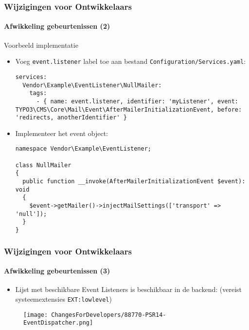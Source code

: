 \begin{frame}[fragile]
	\frametitle{Wijzigingen voor Ontwikkelaars}
	\framesubtitle{Afwikkeling gebeurtenissen (2)}

	\lstset{basicstyle=\tiny\ttfamily}

	Voorbeeld implementatie

	\begin{itemize}\smaller
		\item[\ding{202}] Voeg \texttt{event.listener} label toe aan bestand \texttt{Configuration/Services.yaml}:

\begin{lstlisting}
services:
  Vendor\Example\EventListener\NullMailer:
    tags:
      - { name: event.listener, identifier: 'myListener', event: TYPO3\CMS\Core\Mail\Event\AfterMailerInitializationEvent, before: 'redirects, anotherIdentifier' }
\end{lstlisting}

		\item[\ding{203}] Implementeer het event object:

\begin{lstlisting}
namespace Vendor\Example\EventListener;

class NullMailer
{
  public function __invoke(AfterMailerInitializationEvent $event): void
  {
    $event->getMailer()->injectMailSettings(['transport' => 'null']);
  }
}
\end{lstlisting}

	\end{itemize}\normalsize

\end{frame}


\begin{frame}[fragile]
	\frametitle{Wijzigingen voor Ontwikkelaars}
	\framesubtitle{Afwikkeling gebeurtenissen (3)}

	\lstset{basicstyle=\tiny\ttfamily}

	\begin{itemize}
		\item Lijst met beschikbare Event Listeners is beschikbaar in de backend:\newline
			\smaller
				(vereist systeemextensies \texttt{EXT:lowlevel})
			\normalsize
	\end{itemize}

	\begin{figure}
		\texttt{[image: ChangesForDevelopers/88770-PSR14-EventDispatcher.png]}
	\end{figure}

\end{frame}


